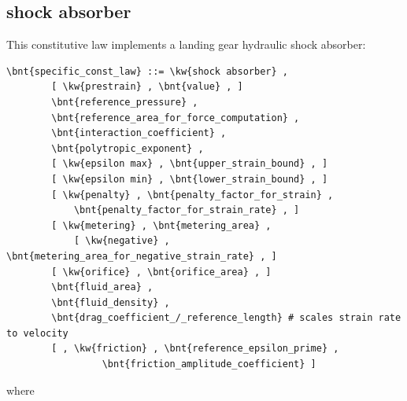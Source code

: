 \subsection{shock absorber}\label{sec:CL:SHOCK-ABSORBER}
This constitutive law implements a landing gear hydraulic shock absorber:
\begin{Verbatim}[commandchars=\\\{\}]
    \bnt{specific_const_law} ::= \kw{shock absorber} ,
        [ \kw{prestrain} , \bnt{value} , ]
        \bnt{reference_pressure} ,
        \bnt{reference_area_for_force_computation} ,
        \bnt{interaction_coefficient} ,
        \bnt{polytropic_exponent} ,
        [ \kw{epsilon max} , \bnt{upper_strain_bound} , ]
        [ \kw{epsilon min} , \bnt{lower_strain_bound} , ]
        [ \kw{penalty} , \bnt{penalty_factor_for_strain} , 
            \bnt{penalty_factor_for_strain_rate} , ]
        [ \kw{metering} , \bnt{metering_area} ,
            [ \kw{negative} , \bnt{metering_area_for_negative_strain_rate} , ]
        [ \kw{orifice} , \bnt{orifice_area} , ]
        \bnt{fluid_area} ,
        \bnt{fluid_density} ,
        \bnt{drag_coefficient_/_reference_length} # scales strain rate to velocity
        [ , \kw{friction} , \bnt{reference_epsilon_prime} ,
                 \bnt{friction_amplitude_coefficient} ]
\end{Verbatim}
where
